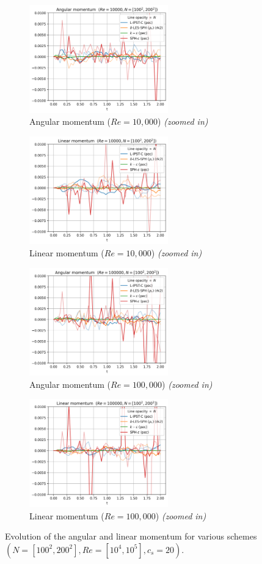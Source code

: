 \begin{figure}[htbp!]
  \begin{subfigure}{7cm}
  \centering\includegraphics[width=6cm]{Code-Figures/long-tgv/limit_am_re_10000.png}
  \caption{Angular momentum ($Re = 10,000$) \textit{(zoomed in)}}
  \end{subfigure}
  \begin{subfigure}{7cm}
  \centering\includegraphics[width=6cm]{Code-Figures/long-tgv/limit_lm_re_10000.png}
  \caption{Linear momentum ($Re = 10,000$) \textit{(zoomed in)}}
  \end{subfigure}
  \begin{subfigure}{7cm}
  \centering\includegraphics[width=6cm]{Code-Figures/long-tgv/limit_am_re_100000.png}
  \caption{Angular momentum ($Re = 100,000$) \textit{(zoomed in)}}
  \end{subfigure}
  \begin{subfigure}{7cm}
  \centering\includegraphics[width=6cm]{Code-Figures/long-tgv/limit_lm_re_100000.png}
  \caption{Linear momentum ($Re = 100,000$) \textit{(zoomed in)}}
  \end{subfigure}
  \caption{Evolution of the angular and linear momentum for various schemes $(N=[100^2, 200^2], Re=[10^4, 10^5], c_s=20)$.}
  \label{fig:ltgv-am-lm}
\end{figure}

